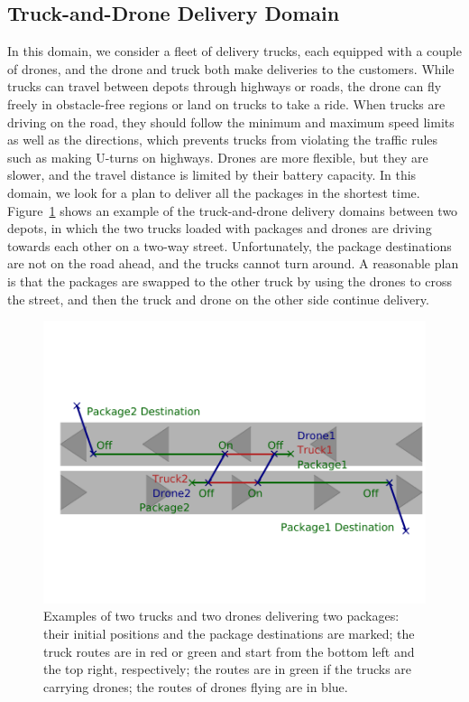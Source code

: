\documentclass[sigconf]{acmart}
\begin{document}
\subsection{Truck-and-Drone Delivery Domain}\label{section:results:delivery}

In this domain, we consider a fleet of delivery trucks, each equipped with a couple of drones, and the drone and truck both make deliveries to the customers. While trucks can travel between depots through highways or roads, the drone can fly freely in obstacle-free regions or land on trucks to take a ride. When trucks are driving on the road, they should follow the minimum and maximum speed limits as well as the directions, which prevents trucks from violating the traffic rules such as making U-turns on highways. Drones are more flexible, but they are slower, and the travel distance is limited by their battery capacity. In this domain, we look for a plan to deliver all the packages in the shortest time. Figure~\ref{fig:truck_drone} shows an example of the truck-and-drone delivery domains between two depots, in which the two trucks loaded with packages and drones are driving towards each other on a two-way street. Unfortunately, the package destinations are not on the road ahead, and the trucks cannot turn around. A reasonable plan is that the packages are swapped to the other truck by using the drones to cross the street, and then the truck and drone on the other side continue delivery. 


\begin{figure}[]
    \centering
    \includegraphics[trim={0.65cm 2.6cm 0.15cm 3cm},clip,width=0.9\columnwidth]{images/truck_drone.pdf}
    \caption{\small Examples of two trucks and two drones delivering two packages:  their initial positions and the package destinations are marked; the truck routes are in red or green and start from the bottom left and the top right, respectively; the routes are in green if the trucks are carrying drones; the routes of drones flying are in blue.}
    \label{fig:truck_drone}
\end{figure}
\end{document}
